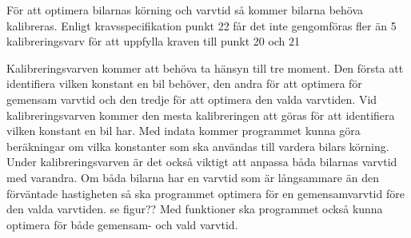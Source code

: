 För att optimera bilarnas körning och varvtid så kommer bilarna behöva kalibreras. Enligt kravsspecifikation punkt 22 får det inte gengomföras fler än 5 kalibreringsvarv för att uppfylla kraven till punkt 20 och 21

Kalibreringsvarven kommer att behöva ta hänsyn till tre moment. Den första att identifiera vilken konstant en bil behöver, den andra för att optimera för gemensam varvtid och den tredje för att optimera den valda varvtiden. Vid kalibreringsvarven kommer den mesta kalibreringen att göras för att identifiera vilken konstant en bil har. Med indata kommer programmet kunna göra beräkningar om vilka konstanter som ska användas till vardera bilars körning. Under kalibreringsvarven är det också viktigt att anpassa båda bilarnas varvtid med varandra. Om båda bilarna har en varvtid som är långsammare än den förväntade hastigheten så ska programmet optimera för en gemensamvarvtid före den valda varvtiden. se figur?? Med funktioner ska programmet också kunna optimera för både gemensam- och vald varvtid.

